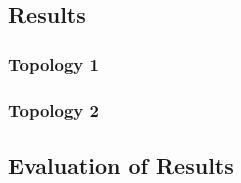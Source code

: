 

\subsection{Results}
\subsubsection{Topology 1}
\subsubsection{Topology 2}

\subsection{Evaluation of Results}